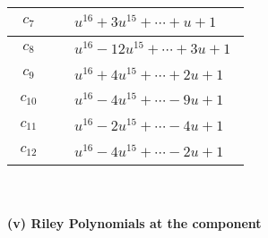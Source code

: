 \documentclass[1p]{elsarticle_modified}
\theoremstyle{definition}
\begin{document}
\begin{tabular}{m{50pt}|m{274pt}}
\hline $$\begin{aligned}c_{7}\end{aligned}$$&$\begin{aligned}
&u^{16}+3 u^{15}+\cdots+u+1
\end{aligned}$\\
\hline $$\begin{aligned}c_{8}\end{aligned}$$&$\begin{aligned}
&u^{16}-12 u^{15}+\cdots+3 u+1
\end{aligned}$\\
\hline $$\begin{aligned}c_{9}\end{aligned}$$&$\begin{aligned}
&u^{16}+4 u^{15}+\cdots+2 u+1
\end{aligned}$\\
\hline $$\begin{aligned}c_{10}\end{aligned}$$&$\begin{aligned}
&u^{16}-4 u^{15}+\cdots-9 u+1
\end{aligned}$\\
\hline $$\begin{aligned}c_{11}\end{aligned}$$&$\begin{aligned}
&u^{16}-2 u^{15}+\cdots-4 u+1
\end{aligned}$\\
\hline $$\begin{aligned}c_{12}\end{aligned}$$&$\begin{aligned}
&u^{16}-4 u^{15}+\cdots-2 u+1
\end{aligned}$\\
\hline
\end{tabular}\\~\\
\newpage\renewcommand{\arraystretch}{1}
\flushleft \textbf{(v) Riley Polynomials at the component}\newline \\
\end{document}
